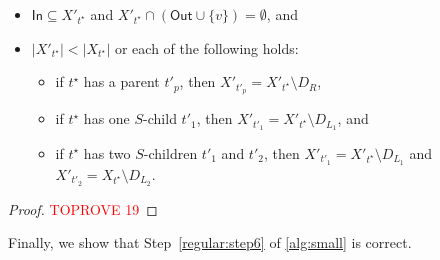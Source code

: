 \documentclass[a4paper,UKenglish,cleveref, autoref, thm-restate, numberwithinsect]{lipics-v2021}
\newcommand{\In}{\mathsf{In}}
\newcommand{\Out}{\mathsf{Out}}
\begin{document}
\begin{lemma}
\begin{itemize}
\item $\In\subseteq X'_{t^{\star}}$ and $X'_{t^{\star}}\cap (\Out\cup\{v\})=\emptyset$, and
\item $|X'_{t^{\star}}|<|X_{t^{\star}}|$ or each of the following holds:
\begin{itemize}
    \item if $t^{\star}$ has a parent $t'_p$, then $X'_{t'_p}=X'_{t^{\star}}\setminus D_R$, 
    \item if $t^{\star}$ has one $S$-child $t'_1$, then $X'_{t'_1}=X'_{t^{\star}}\setminus D_{L_1}$, and 
    \item if $t^{\star}$ has two $S$-children $t'_1$ and $t'_2$, then $X'_{t'_1}=X'_{t^{\star}}\setminus D_{L_1}$ and $X'_{t'_2}=X_{t^{\star}}\setminus D_{L_2}$.
\end{itemize}
\end{itemize}
\end{lemma}
\begin{proof}\textcolor{red}{TOPROVE 19}\end{proof}

Finally, we show that Step~\ref{regular:step6} of \cref{alg:small} is correct.
\end{document}
